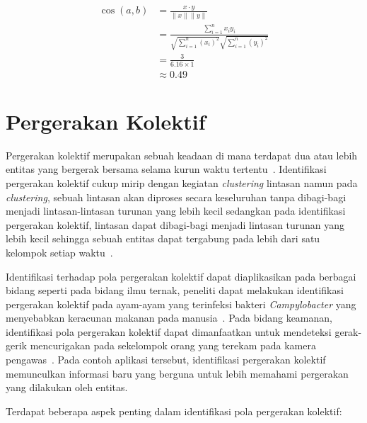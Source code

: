 \begin{align*}
    \cos (a, b) & = \frac{x \cdot y}{\|x\| \|y\|} \\
    & = \frac{ \sum_{i=1}^{n}{x_i y_i}}{ \sqrt{\sum_{i=1}^{n}{(x_i)^2}} \sqrt{\sum_{i=1}^{n}{(y_i)^2}}} \\
    & = \frac{3}{6.16 \times 1} \\
    & \approx 0.49
\end{align*}

\vspace{-10pt}

\section{Pergerakan Kolektif}
\label{sec:collective-movement}

Pergerakan kolektif merupakan sebuah keadaan di mana terdapat dua atau lebih entitas yang bergerak bersama selama kurun waktu tertentu~\cite{wiratma:trajectory}. Identifikasi pergerakan kolektif cukup mirip dengan kegiatan \textit{clustering} lintasan namun pada \textit{clustering}, sebuah lintasan akan diproses secara keseluruhan tanpa dibagi-bagi menjadi lintasan-lintasan turunan yang lebih kecil sedangkan pada identifikasi pergerakan kolektif, lintasan dapat dibagi-bagi menjadi lintasan turunan yang lebih kecil sehingga sebuah entitas dapat tergabung pada lebih dari satu kelompok setiap waktu~\cite{wiratma:trajectory}.

Identifikasi terhadap pola pergerakan kolektif dapat diaplikasikan pada berbagai bidang seperti pada bidang ilmu ternak, peneliti dapat melakukan identifikasi pergerakan kolektif pada ayam-ayam yang terinfeksi bakteri \textit{Campylobacter} yang menyebabkan keracunan makanan pada manusia~\cite{colles:02:chicken}. Pada bidang keamanan, identifikasi pola pergerakan kolektif dapat dimanfaatkan untuk mendeteksi gerak-gerik mencurigakan pada sekelompok orang yang terekam pada kamera pengawas~\cite{makris:01:security}. Pada contoh aplikasi tersebut, identifikasi pergerakan kolektif memunculkan informasi baru yang berguna untuk lebih memahami pergerakan yang dilakukan oleh entitas.

\noindent Terdapat beberapa aspek penting dalam identifikasi pola pergerakan kolektif:

